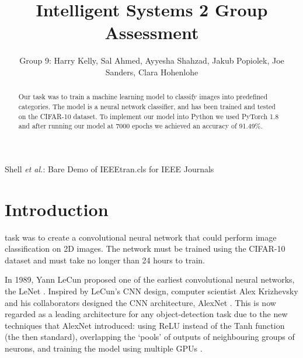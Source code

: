 \documentclass[journal]{IEEEtran}
\begin{document}
\title{Intelligent Systems 2 Group Assessment }

\author{Group 9: Harry Kelly, Sal Ahmed, Ayyesha Shahzad, Jakub Popiolek, Joe Sanders, Clara Hohenlohe}

{Shell \MakeLowercase{\textit{et al.}}: Bare Demo of IEEEtran.cls for IEEE Journals}

\maketitle

\begin{abstract}
Our task was to train a machine learning model to classify images into predefined categories. The model is a neural network classifier, and has been trained and tested on the CIFAR-10 dataset. To implement our model into Python we used PyTorch 1.8 and after running our model at 7000 epochs we achieved an accuracy of 91.49\%.
\end{abstract}

\IEEEpeerreviewmaketitle

\section{Introduction}

 task was to create a convolutional neural network that could perform image classification on 2D images. The network must be trained using the CIFAR-10 dataset and must take no longer than 24 hours to train.

In 1989, Yann LeCun proposed one of the earliest convolutional neural networks, the LeNet \cite{LeCun1989}. Inspired by LeCun’s CNN design, computer scientist Alex Krizhevsky and his collaborators designed the CNN architecture, AlexNet \cite{AlexNetArticle}. This is now regarded as a leading architecture for any object-detection task due to the new techniques that AlexNet introduced: using ReLU instead of the Tanh function (the then standard), overlapping the ‘pools’ of outputs of neighbouring groups of neurons, and training the model using multiple GPUs \cite{tdsAlexNet}. 
\end{document}
